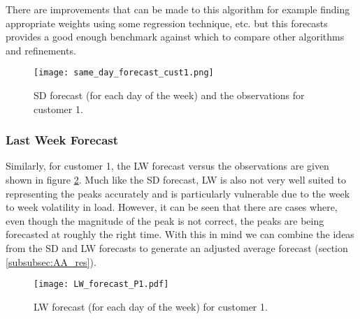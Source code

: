 \documentclass[a4paper]{article}
\begin{document}
There are improvements that can be made to this algorithm for example finding appropriate weights using some regression technique, etc. but this forecasts provides a good enough benchmark against which to compare other algorithms and refinements.


\begin{figure}
\centering
\texttt{[image: same\_day\_forecast\_cust1.png]}
\caption{SD forecast (for each day of the week) and the observations for customer 1.}
\label{fig:SDforecast} 
\end{figure}

\subsubsection{Last Week Forecast} \label{subsubsec:LW_res}
Similarly, for customer 1, the LW forecast versus the observations are given shown in figure \ref{fig:LW_forecast_P1}. Much like the SD forecast, LW is also not very well suited to representing the peaks accurately and is particularly vulnerable due to the week to week volatility in load. However, it can be seen that there are cases where, even though the magnitude of the peak is not correct, the peaks are being forecasted at roughly the right time. With this in mind we can combine the ideas from the SD and LW forecasts to generate an adjusted average forecast (section \ref{subsubsec:AA_res}).

\begin{figure}
\texttt{[image: LW\_forecast\_P1.pdf]}
\caption{LW forecast (for each day of the week) for customer 1.}
\label{fig:LW_forecast_P1} 
\end{figure}
\end{document}
